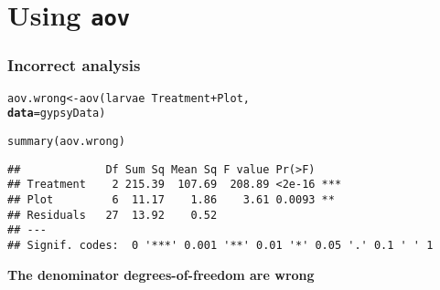 \documentclass[color=usenames,dvipsnames]{beamer}\usepackage[]{graphicx}\usepackage[]{color}
\makeatletter
\newcommand{\hlopt}[1]{\textcolor[rgb]{0,0,0}{#1}}%
\newcommand{\hlstd}[1]{\textcolor[rgb]{0,0,0}{#1}}%
\newcommand{\hlkwb}[1]{\textcolor[rgb]{0,0.341,0.682}{#1}}%
\newcommand{\hlkwc}[1]{\textcolor[rgb]{0,0,0}{\textbf{#1}}}%
\newcommand{\hlkwd}[1]{\textcolor[rgb]{0.004,0.004,0.506}{#1}}%
\newenvironment{kframe}{%
 \def\at@end@of@kframe{}%
 \ifinner\ifhmode%
  \def\at@end@of@kframe{\end{minipage}}%
  \begin{minipage}{\columnwidth}%
 \fi\fi%
 \def\FrameCommand##1{\hskip\@totalleftmargin \hskip-\fboxsep
 \colorbox{shadecolor}{##1}\hskip-\fboxsep
     \hskip-\linewidth \hskip-\@totalleftmargin \hskip\columnwidth}%
 \MakeFramed {\advance\hsize-\width
   \@totalleftmargin\z@ \linewidth\hsize
   \@setminipage}}%
 {\par\unskip\endMakeFramed%
 \at@end@of@kframe}
\newenvironment{knitrout}{}{} %
\makeatother
\begin{document}
\section{Using {\tt aov}}



\begin{frame}[fragile]
  \frametitle{Incorrect analysis}
\begin{knitrout}
\color{fgcolor}\begin{kframe}
\begin{alltt}
\hlstd{aov.wrong} \hlkwb{<-} \hlkwd{aov}\hlstd{(larvae} \hlopt{~} \hlstd{Treatment} \hlopt{+} \hlstd{Plot,}
                 \hlkwc{data}\hlstd{=gypsyData)}
\end{alltt}
\end{kframe}
\end{knitrout}
\pause
\begin{knitrout}
\color{fgcolor}\begin{kframe}
\begin{alltt}
\hlkwd{summary}\hlstd{(aov.wrong)}
\end{alltt}
\begin{verbatim}
##             Df Sum Sq Mean Sq F value Pr(>F)    
## Treatment    2 215.39  107.69  208.89 <2e-16 ***
## Plot         6  11.17    1.86    3.61 0.0093 ** 
## Residuals   27  13.92    0.52                   
## ---
## Signif. codes:  0 '***' 0.001 '**' 0.01 '*' 0.05 '.' 0.1 ' ' 1
\end{verbatim}
\end{kframe}
\end{knitrout}
\pause
\vfill
\centering
\large
\bf
\alert{The denominator degrees-of-freedom are wrong} \par
\end{frame}
\end{document}
